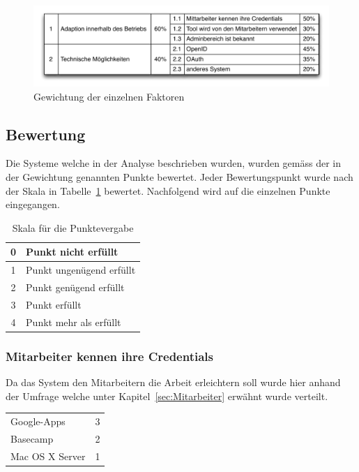 \begin{figure}[H]
    \centering 
		\includegraphics[width=1\textwidth]{include/nutzwertanalyse1.pdf}
		\caption{Gewichtung der einzelnen Faktoren}
		\label{fig:nutzwertanalyse gewichtung}
\end{figure}

\subsection{Bewertung}
\label{sub:Bewertung}
Die Systeme welche in der Analyse beschrieben wurden, wurden gemäss der in der Gewichtung genannten Punkte bewertet. Jeder Bewertungspunkt wurde nach der Skala in Tabelle~\ref{tab:nutzwertanalyse skala} bewertet. Nachfolgend wird auf die einzelnen Punkte eingegangen.

\begin{table}[h]
    \centering
        \begin{tabular}{|c|l|}
        \hline
        0 & Punkt nicht erfüllt\\
        \hline
        1 & Punkt ungenügend erfüllt\\
        \hline
        2 & Punkt genügend erfüllt\\
        \hline
        3 & Punkt erfüllt\\
        \hline
        4 & Punkt mehr als erfüllt\\
        \hline
        \end{tabular}
		\caption{Skala für die Punktevergabe}
		\label{tab:nutzwertanalyse skala}
\end{table}


\subsubsection{Mitarbeiter kennen ihre Credentials}
\label{ssub:Mitarbeiter kennen ihre Credentials}
Da das System den Mitarbeitern die Arbeit erleichtern soll wurde hier anhand der Umfrage welche unter Kapitel~\ref{sec:Mitarbeiter} erwähnt wurde verteilt.

\begin{tabular}{lc}
Google-Apps & 3\\
Basecamp & 2\\
Mac OS X Server & 1\\
\end{tabular}

